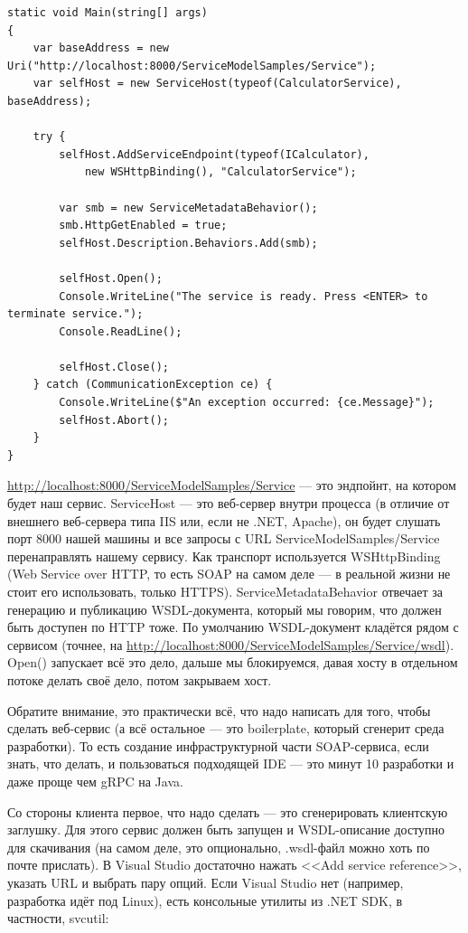 \documentclass[a5paper]{article}
\begin{document}
\begin{verbatim}
static void Main(string[] args) 
{
    var baseAddress = new Uri("http://localhost:8000/ServiceModelSamples/Service");
    var selfHost = new ServiceHost(typeof(CalculatorService), baseAddress);

    try {
        selfHost.AddServiceEndpoint(typeof(ICalculator), 
            new WSHttpBinding(), "CalculatorService");

        var smb = new ServiceMetadataBehavior();
        smb.HttpGetEnabled = true;
        selfHost.Description.Behaviors.Add(smb);

        selfHost.Open();
        Console.WriteLine("The service is ready. Press <ENTER> to terminate service.");
        Console.ReadLine();

        selfHost.Close();  
    } catch (CommunicationException ce) {
        Console.WriteLine($"An exception occurred: {ce.Message}");
        selfHost.Abort();
    }
}
\end{verbatim}

\url{http://localhost:8000/ServiceModelSamples/Service} --- это эндпойнт, на котором будет наш сервис. ServiceHost --- это веб-сервер внутри процесса (в отличие от внешнего веб-сервера типа IIS или, если не .NET, Apache), он будет слушать порт 8000 нашей машины и все запросы с URL ServiceModelSamples/Service перенаправлять нашему сервису. Как транспорт используется WSHttpBinding (Web Service over HTTP, то есть SOAP на самом деле --- в реальной жизни не стоит его использовать, только HTTPS). ServiceMetadataBehavior отвечает за генерацию и публикацию WSDL-документа, который мы говорим, что должен быть доступен по HTTP тоже. По умолчанию WSDL-документ кладётся рядом с сервисом (точнее, на \url{http://localhost:8000/ServiceModelSamples/Service/wsdl}). Open() запускает всё это дело, дальше мы блокируемся, давая хосту в отдельном потоке делать своё дело, потом закрываем хост.

Обратите внимание, это практически всё, что надо написать для того, чтобы сделать веб-сервис (а всё остальное --- это boilerplate, который сгенерит среда разработки). То есть создание инфраструктурной части SOAP-сервиса, если знать, что делать, и пользоваться подходящей IDE --- это минут 10 разработки и даже проще чем gRPC на Java.

Со стороны клиента первое, что надо сделать --- это сгенерировать клиентскую заглушку. Для этого сервис должен быть запущен и WSDL-описание доступно для скачивания (на самом деле, это опционально, .wsdl-файл можно хоть по почте прислать). В Visual Studio достаточно нажать <<Add service reference>>, указать URL и выбрать пару опций. Если Visual Studio нет (например, разработка идёт под Linux), есть консольные утилиты из .NET SDK, в частности, svcutil:
\end{document}
